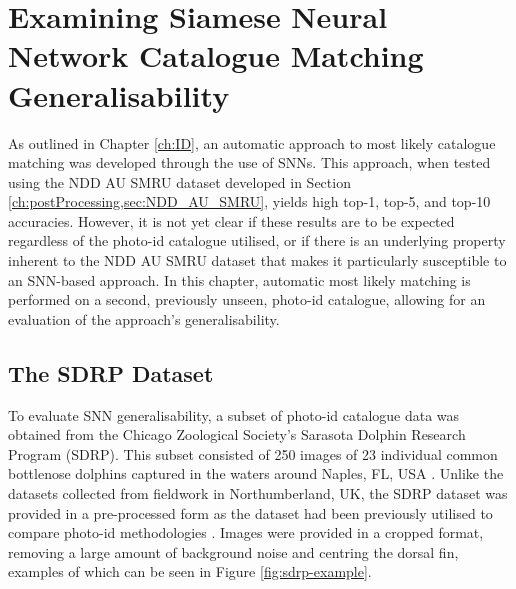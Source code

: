 \section{Examining Siamese Neural Network Catalogue Matching Generalisability }\label{ch:SNNEvaluation,sec:SDRP}

As outlined in Chapter \ref{ch:ID}, an automatic approach to most likely catalogue matching was developed through the use of SNNs. This approach, when tested using the NDD AU SMRU dataset developed in Section \ref{ch:postProcessing,sec:NDD_AU_SMRU}, yields high top-1, top-5, and top-10 accuracies. However, it is not yet clear if these results are to be expected regardless of the photo-id catalogue utilised, or if there is an underlying property inherent to the NDD AU SMRU dataset that makes it particularly susceptible to an SNN-based approach. In this chapter, automatic most likely matching is performed on a second, previously unseen, photo-id catalogue, allowing for an evaluation of the approach's generalisability.

\subsection{The SDRP Dataset}\label{ch:SNNEvaluation,sec:SDRP,sub:SDRPDataset}

To evaluate SNN generalisability, a subset of photo-id catalogue data was obtained from the Chicago Zoological Society's Sarasota Dolphin Research Program (SDRP). This subset consisted of 250 images of 23 individual common bottlenose dolphins captured in the waters around Naples, FL, USA \cite{tyson_moore_final_2020}. Unlike the datasets collected from fieldwork in Northumberland, UK, the SDRP dataset was provided in a pre-processed form as the dataset had been previously utilised to compare photo-id methodologies \cite{tyson_moore_rise_2022}. Images were provided in a cropped format, removing a large amount of background noise and centring the dorsal fin, examples of which can be seen in Figure \ref{fig:sdrp-example}. 

